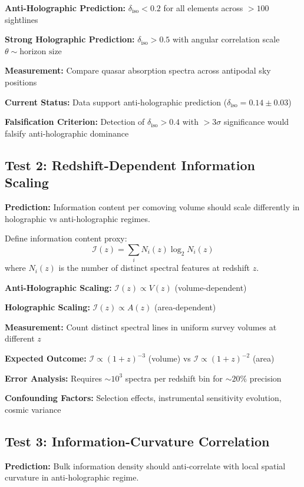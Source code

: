 \documentclass[twocolumn,aps,prd,superscriptaddress,nofootinbib]{revtex4-2}
\begin{document}
\textbf{Anti-Holographic Prediction:} $\delta_{\text{iso}} < 0.2$ for all elements across $> 100$ sightlines

\textbf{Strong Holographic Prediction:} $\delta_{\text{iso}} > 0.5$ with angular correlation scale $\theta \sim \text{horizon size}$

\textbf{Measurement:} Compare quasar absorption spectra across antipodal sky positions

\textbf{Current Status:} Data support anti-holographic prediction ($\delta_{\text{iso}} = 0.14 \pm 0.03$)

\textbf{Falsification Criterion:} Detection of $\delta_{\text{iso}} > 0.4$ with $> 3\sigma$ significance would falsify anti-holographic dominance

\subsection{Test 2: Redshift-Dependent Information Scaling}

\textbf{Prediction:} Information content per comoving volume should scale differently in holographic vs anti-holographic regimes.

Define information content proxy:
\begin{equation}
\mathcal{I}(z) = \sum_i N_i(z) \log_2 N_i(z)
\end{equation}
where $N_i(z)$ is the number of distinct spectral features at redshift $z$.

\textbf{Anti-Holographic Scaling:} $\mathcal{I}(z) \propto V(z)$ (volume-dependent)

\textbf{Holographic Scaling:} $\mathcal{I}(z) \propto A(z)$ (area-dependent)

\textbf{Measurement:} Count distinct spectral lines in uniform survey volumes at different $z$

\textbf{Expected Outcome:} $\mathcal{I} \propto (1+z)^{-3}$ (volume) vs $\mathcal{I} \propto (1+z)^{-2}$ (area)

\textbf{Error Analysis:} Requires $\sim 10^3$ spectra per redshift bin for $\sim 20\%$ precision

\textbf{Confounding Factors:} Selection effects, instrumental sensitivity evolution, cosmic variance

\subsection{Test 3: Information-Curvature Correlation}

\textbf{Prediction:} Bulk information density should anti-correlate with local spatial curvature in anti-holographic regime.
\end{document}
